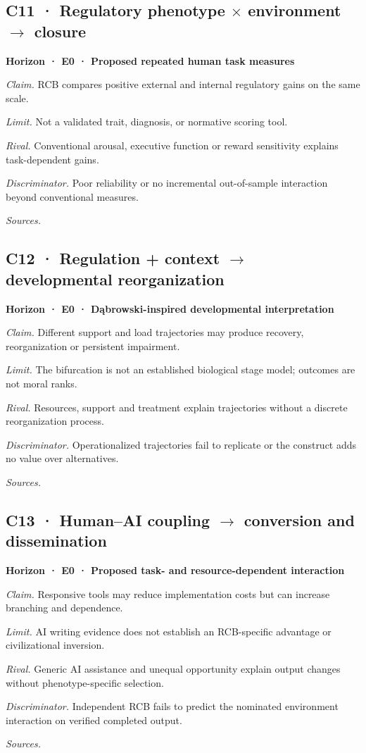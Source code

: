 \subsection*{C11 · Regulatory phenotype \ensuremath{\times} environment \ensuremath{\rightarrow} closure}
\noindent\textbf{Horizon · E0 · Proposed repeated human task measures}\par
\textit{Claim.} RCB compares positive external and internal regulatory gains on the same scale.\par
\textit{Limit.} Not a validated trait, diagnosis, or normative scoring tool.\par
\textit{Rival.} Conventional arousal, executive function or reward sensitivity explains task-dependent gains.\par
\textit{Discriminator.} Poor reliability or no incremental out-of-sample interaction beyond conventional measures.\par
\textit{Sources.} \cite{projP1,projP2,ref16}\par
\subsection*{C12 · Regulation + context \ensuremath{\rightarrow} developmental reorganization}
\noindent\textbf{Horizon · E0 · Dąbrowski-inspired developmental interpretation}\par
\textit{Claim.} Different support and load trajectories may produce recovery, reorganization or persistent impairment.\par
\textit{Limit.} The bifurcation is not an established biological stage model; outcomes are not moral ranks.\par
\textit{Rival.} Resources, support and treatment explain trajectories without a discrete reorganization process.\par
\textit{Discriminator.} Operationalized trajectories fail to replicate or the construct adds no value over alternatives.\par
\textit{Sources.} \cite{projP1,ref17}\par
\subsection*{C13 · Human–AI coupling \ensuremath{\rightarrow} conversion and dissemination}
\noindent\textbf{Horizon · E0 · Proposed task- and resource-dependent interaction}\par
\textit{Claim.} Responsive tools may reduce implementation costs but can increase branching and dependence.\par
\textit{Limit.} AI writing evidence does not establish an RCB-specific advantage or civilizational inversion.\par
\textit{Rival.} Generic AI assistance and unequal opportunity explain output changes without phenotype-specific selection.\par
\textit{Discriminator.} Independent RCB fails to predict the nominated environment interaction on verified completed output.\par
\textit{Sources.} \cite{projP2,ref21}\par
